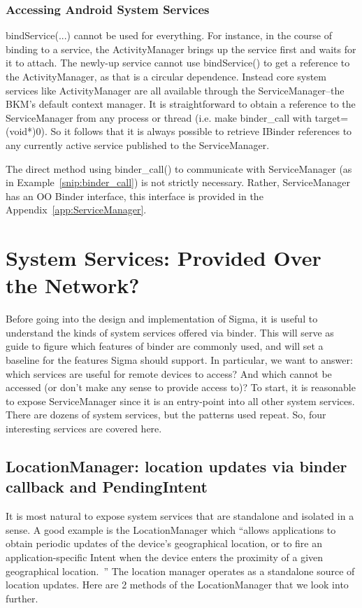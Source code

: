 \documentclass[prodmode]{acmlarge}
\begin{document}
\subsubsection{Accessing Android System Services}
bindService(...) cannot be used for everything. For instance, in the course of binding to a service, the ActivityManager brings up the service first and waits for it to attach. The newly-up service cannot use bindService() to get a reference to the ActivityManager, as that is a circular dependence. Instead core system services like ActivityManager are all available through the ServiceManager--the BKM's default context manager. It is straightforward to obtain a reference to the ServiceManager from any process or thread (i.e. make binder\_call with target=(void*)0). So it follows that it is always possible to retrieve IBinder references to any currently active service published to the ServiceManager.

The direct method using binder\_call() to communicate with ServiceManager (as in Example~\ref{snip:binder_call}) is not strictly necessary. Rather, ServiceManager has an OO Binder interface, this interface is provided in the Appendix~\ref{app:ServiceManager}. 

\section{System Services: Provided Over the Network?}
\label{sec:SystemServices}
Before going into the design and implementation of Sigma, it is useful to understand the kinds of system services offered via binder. This will serve as guide to figure which features of binder are commonly used, and will set a baseline for the features Sigma should support. In particular, we want to answer: which services are useful for remote devices to access? And which cannot be accessed (or don't make any sense to provide access to)?  To start, it is reasonable to expose ServiceManager since it is an entry-point into all other system services. There are dozens of system services, but the patterns used repeat. So, four interesting services are covered here.

\subsection{LocationManager: location updates via binder callback and PendingIntent}
It is most natural to expose system services that are standalone and isolated in a sense. A good example is the LocationManager which ``allows applications to obtain periodic updates of the device's geographical location, or to fire an application-specific Intent when the device enters the proximity of a given geographical location.~\cite{LocationManagerDocs}'' The location manager operates as a standalone source of location updates. Here are 2 methods of the LocationManager that we look into further.
\end{document}
